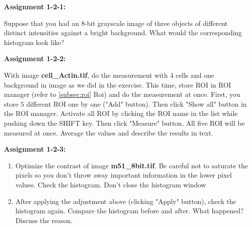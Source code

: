 \textbf{\sffamily
Assignment 1-2-1:}

Suppose that you had an 8-bit grayscale image of three objects of
different distinct intensities against a bright background. What would
the corresponding histogram look like?

\textbf{\sffamily
Assignment 1-2-2: }

With image \textbf{cell\_Actin.tif}, do the measurement with 4 cells and one background in image as we did in the
exercise. This time, store ROI in ROI manager (refer to \ref{subsec:roi} Roi)
and do the measurement at once. First, you store 5 different ROI one by
one ("Add" button). Then click "Show all" button in the ROI manager.
Activate all ROI by clicking the ROI name in the list while pushing
down the SHIFT key. Then click "Measure"
button. All five ROI will be measured at once. Average the values and
describe the results in text.

\textbf{\sffamily
Assignment 1-2-3: }
\begin{enumerate}
\item Optimize the contrast of image
\textbf{m51\_8bit.tif}. Be careful not to
saturate the pixels so you don't throw away important
information in the lower pixel values. Check the histogram.
Don't close the histogram window

\item After applying the adjustment above (clicking
"Apply" button), check the histogram
again. Compare the histogram before and after. What happened? Discuss
the reason.
\end{enumerate}
